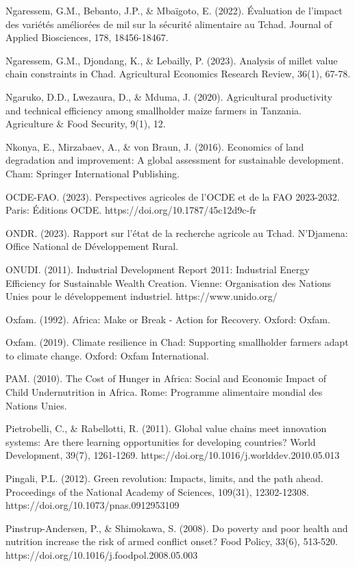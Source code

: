 \documentclass[12pt,oneside]{report}
\begin{document}
Ngaressem, G.M., Bebanto, J.P., \& Mbaïgoto, E. (2022). Évaluation de l'impact des variétés améliorées de mil sur la sécurité alimentaire au Tchad. Journal of Applied Biosciences, 178, 18456-18467.

Ngaressem, G.M., Djondang, K., \& Lebailly, P. (2023). Analysis of millet value chain constraints in Chad. Agricultural Economics Research Review, 36(1), 67-78.

Ngaruko, D.D., Lwezaura, D., \& Mduma, J. (2020). Agricultural productivity and technical efficiency among smallholder maize farmers in Tanzania. Agriculture \& Food Security, 9(1), 12.

Nkonya, E., Mirzabaev, A., \& von Braun, J. (2016). Economics of land degradation and improvement: A global assessment for sustainable development. Cham: Springer International Publishing.

OCDE-FAO. (2023). Perspectives agricoles de l'OCDE et de la FAO 2023-2032. Paris: Éditions OCDE. https://doi.org/10.1787/45c12d9c-fr

ONDR. (2023). Rapport sur l'état de la recherche agricole au Tchad. N'Djamena: Office National de Développement Rural.

ONUDI. (2011). Industrial Development Report 2011: Industrial Energy Efficiency for Sustainable Wealth Creation. Vienne: Organisation des Nations Unies pour le développement industriel. https://www.unido.org/

Oxfam. (1992). Africa: Make or Break - Action for Recovery. Oxford: Oxfam.

Oxfam. (2019). Climate resilience in Chad: Supporting smallholder farmers adapt to climate change. Oxford: Oxfam International.

PAM. (2010). The Cost of Hunger in Africa: Social and Economic Impact of Child Undernutrition in Africa. Rome: Programme alimentaire mondial des Nations Unies.

Pietrobelli, C., \& Rabellotti, R. (2011). Global value chains meet innovation systems: Are there learning opportunities for developing countries? World Development, 39(7), 1261-1269. https://doi.org/10.1016/j.worlddev.2010.05.013

Pingali, P.L. (2012). Green revolution: Impacts, limits, and the path ahead. Proceedings of the National Academy of Sciences, 109(31), 12302-12308. https://doi.org/10.1073/pnas.0912953109

Pinstrup-Andersen, P., \& Shimokawa, S. (2008). Do poverty and poor health and nutrition increase the risk of armed conflict onset? Food Policy, 33(6), 513-520. https://doi.org/10.1016/j.foodpol.2008.05.003
\end{document}
